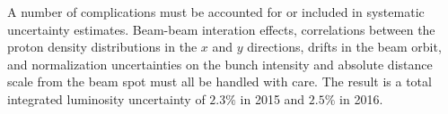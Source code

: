 A number of complications must be accounted for or included in systematic uncertainty estimates.
Beam-beam interation effects, correlations between the proton density distributions in the $x$ and $y$ directions, drifts in the beam orbit, and normalization uncertainties on the bunch intensity and absolute distance scale from the beam spot must all be handled with care.
The result is a total integrated luminosity uncertainty of $2.3\%$ in 2015 and $2.5\%$ in 2016\@.
